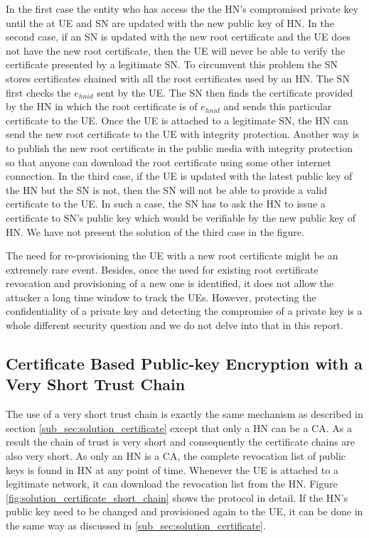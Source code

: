 \documentclass[lnicst,sechang,a4paper]{svmultln}
\begin{document}
In the first case the entity who has access the the HN's compromised private key until the at UE and SN are updated with the new public key of HN. In the second case, if an SN is updated with the new root certificate and the UE does not have the new root certificate, then the UE will never be able to verify the certificate presented by a legitimate SN. To circumvent this problem the SN stores certificates chained with all the root certificates used by an HN. The SN first checks the $e_{hnid}$ sent by the UE. The SN then finds the certificate provided by the HN in which the root certificate is of $e_{hnid}$ and sends this particular certificate to the UE. Once the UE is attached to a legitimate SN, the HN can send the new root certificate to the UE with integrity protection. Another way is to publish the new root certificate in the public media with integrity protection so that anyone can download the root certificate using some other internet connection. In the third case, if the UE is updated with the latest public key of the HN but the SN is not, then the SN will not be able to provide a valid certificate to the UE. In such a case, the SN has to ask the HN to issue a certificate to SN's public key which would be verifiable by the new public key of HN. We have not present the solution of the third case in the figure.

The need for re-provisioning the UE with a new root certificate might be an extremely rare event. Besides, once the need for existing root certificate revocation and provisioning of a new one is identified, it does not allow the attacker a long time window to track the UEs. However, protecting the confidentiality of a private key and detecting the compromise of a private key is a whole different security question and we do not delve into that in this report.


\subsection{Certificate Based Public-key Encryption with a Very Short Trust Chain} 
\label{sub_sec:solution_certificate_short_chain}
The use of a very short trust chain is exactly the same mechanism as described in section \ref{sub_sec:solution_certificate} except that only a HN can be a CA. As a result the chain of trust is very short and consequently the certificate chains are also very short. As only an HN is a CA, the complete revocation list of public keys is found in HN at any point of time. Whenever the UE is attached to a legitimate network, it can download the revocation list from the HN. Figure \ref{fig:solution_certificate_short_chain} shows the protocol in detail. If the HN's public key need to be changed and provisioned again to the UE, it can be done in the same way as discussed in \ref{sub_sec:solution_certificate}.
\end{document}
